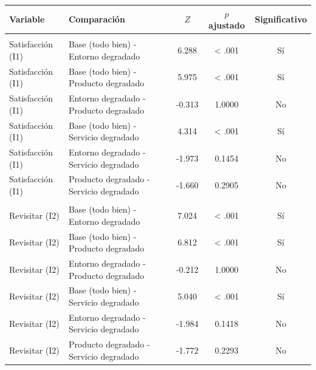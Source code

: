 \documentclass[
  spanish,
]{article}
\begin{document}
\begin{table}[!h]
\centering\begingroup\fontsize{9}{11}\selectfont

\begin{tabular}{llccc}
\toprule
Variable & Comparación & $Z$ & $p$ ajustado & Significativo\\
\midrule
\addlinespace[0.3em]
\multicolumn{5}{l}{\textbf{Revisitar (I2)}}\\
\hspace{1em}Satisfacción (I1) & Base (todo bien) - Entorno degradado & 6.288 & < .001 & Sí\\
\hspace{1em}Satisfacción (I1) & Base (todo bien) - Producto degradado & 5.975 & < .001 & Sí\\
\hspace{1em}Satisfacción (I1) & Entorno degradado - Producto degradado & -0.313 & 1.0000 & No\\
\hspace{1em}Satisfacción (I1) & Base (todo bien) - Servicio degradado & 4.314 & < .001 & Sí\\
\hspace{1em}Satisfacción (I1) & Entorno degradado - Servicio degradado & -1.973 & 0.1454 & No\\
\hspace{1em}Satisfacción (I1) & Producto degradado - Servicio degradado & -1.660 & 0.2905 & No\\
\addlinespace[0.3em]
\multicolumn{5}{l}{\textbf{Satisfacción (I1)}}\\
\hspace{1em}Revisitar (I2) & Base (todo bien) - Entorno degradado & 7.024 & < .001 & Sí\\
\hspace{1em}Revisitar (I2) & Base (todo bien) - Producto degradado & 6.812 & < .001 & Sí\\
\hspace{1em}Revisitar (I2) & Entorno degradado - Producto degradado & -0.212 & 1.0000 & No\\
\hspace{1em}Revisitar (I2) & Base (todo bien) - Servicio degradado & 5.040 & < .001 & Sí\\
\hspace{1em}Revisitar (I2) & Entorno degradado - Servicio degradado & -1.984 & 0.1418 & No\\
\hspace{1em}Revisitar (I2) & Producto degradado - Servicio degradado & -1.772 & 0.2293 & No\\
\bottomrule
\end{tabular}
\endgroup{}
\end{table}
\end{document}

